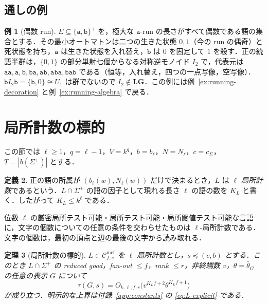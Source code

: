 \documentclass[11pt,a4paper]{ltjsarticle}
\numberwithin{equation}{section}
\theoremstyle{plain}
\newtheorem{theorem}{定理}[section]
\theoremstyle{definition}
\newtheorem{definition}[theorem]{定義}
\newtheorem{example}[theorem]{例}
\theoremstyle{remark}
\theoremstyle{plain}
\newcommand{\Cmcf}[2]{\mathcal{C}^{\mathrm{mcf}}_{#1,#2}}
\newcommand{\LG}{\mathbf{LG}}
\newcommand{\bth}{\bar\theta}
\newcommand{\Kocc}{K_L}
\begin{document}
\subsection{通しの例}

\begin{example}[偶数 run]
\label{ex:running}
$E\subseteq\{\mathtt a,\mathtt b\}^+$ を，極大な $\mathtt a$-run の長さがすべて偶数である語の集合とする．その最小オートマトンは二つの生きた状態 $0,1$（今の run の偶奇）と死状態を持ち，$\mathtt a$ は生きた状態を入れ替え，$\mathtt b$ は $0$ を固定して $1$ を殺す．正の統語半群は，$\{0,1\}$ の部分単射七個からなる対称逆モノイド $I_2$ で，代表元は $\mathtt{aa},\mathtt a,\mathtt b,\mathtt{ba},\mathtt{ab},\mathtt{aba},\mathtt{bab}$ である（恒等，入れ替え，四つの一点写像，空写像）．$\mathtt bI_2\mathtt b=\{\mathtt b,0\}\cong U_1$ は群でないので $I_2\notin\LG$．この例には例~\ref{ex:running-decoration} と例~\ref{ex:running-algebra} で戻る．
\end{example}

\section{局所計数の標的}
\label{sec:L}

この節では $\ell\ge1$，$q=\ell-1$，$V=k^q$，$b=b_\ell$，$N=N_\ell$，$c=c_\Sigma$，$T=|b(\Sigma^+)|$ とする．

\begin{definition}
正の語の所属が $(b_\ell(w),N_\ell(w))$ だけで決まるとき，$L$ は \emph{$\ell$-局所計数}であるという．$L\cap\Sigma^+$ の語の因子として現れる長さ $\ell$ の語の数を $\Kocc$ と書く．したがって $\Kocc\le k^\ell$ である．
\end{definition}

位数 $\ell$ の厳密局所テスト可能・局所テスト可能・局所閾値テスト可能な言語に，文字の個数についての任意の条件を交わらせたものは $\ell$-局所計数である．文字の個数は，最初の頂点と辺の最後の文字から読み取れる．

\begin{theorem}[局所計数の標的]
\label{thm:L}
$L\in\Cmcf{f}{s}$ を $\ell$-局所計数とし，$s\preceq(c,b)$ とする．このとき $L\cap\Sigma^+$ の reduced good，fan-out $\le f$，rank $\le r$，非終端数 $v$，$\theta=\bth_G$ の任意の表示 $G$ について
\[
 \tau(G,s)=O_{k,\ell,f,r}\bigl(v^{\Kocc f+2}\theta^{\Kocc f+1}\bigr)
\]
が成り立つ．明示的な上界は付録~\ref{app:constants} の \eqref{eq:L-explicit} である．
\end{theorem}
\end{document}
